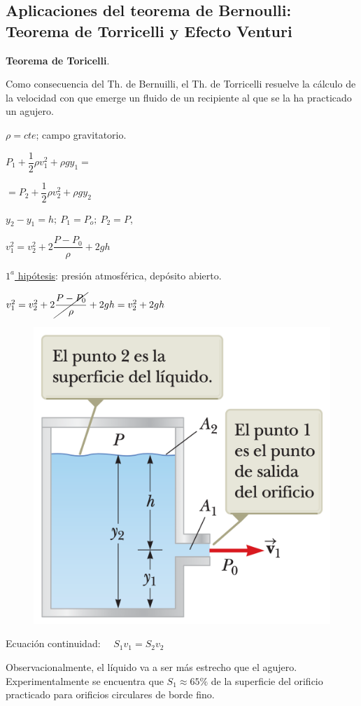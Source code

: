 \subsection{Aplicaciones del teorema de Bernoulli: Teorema de Torricelli y Efecto Venturi}

\vspace{10mm} %

\textbf{\large{Teorema de Toricelli}}\normalsize{.}
\vspace{5mm} %
\begin{miparrafodestacado}
	Como consecuencia del Th. de Bernuilli, el Th. de Torricelli resuelve la cálculo de la velocidad con que emerge un fluido de un recipiente al que se la ha practicado un agujero.
\end{miparrafodestacado}

\vspace{10mm} %
\begin{multicols}{2}
$\rho = cte$; campo gravitatorio.

$P_1+\dfrac 1 2 \rho v_1^2 +\rho g y_1=$

$=P_2+\dfrac 1 2 \rho v_2^2 +\rho g y_2$

$y_2-y_1=h; \ P_1=P_o; \ P_2=P$, 

$v_1^2=v_2^2+2\dfrac{P-P_0}{\rho}+2gh$

\underline{$1^a$ hipótesis}: presión atmosférica, depósito abierto.

$v_1^2=v_2^2+2\cancel{\dfrac{P-P_0}{\rho}}+2gh =v_2^2+2gh$
\begin{figure}[H]
	\centering
	\includegraphics[width=.4\textwidth]{imagenes/imagenes18/T18IM08.png}
	\end{figure}	
\end{multicols}

Ecuación continuidad: $\quad S_1v_1=S_2v_2$

Observacionalmente, el líquido va a ser más estrecho que el agujero. Experimentalmente se encuentra que $S_1\approx 65\%$ de la superficie del orificio practicado para orificios circulares de borde fino. 

